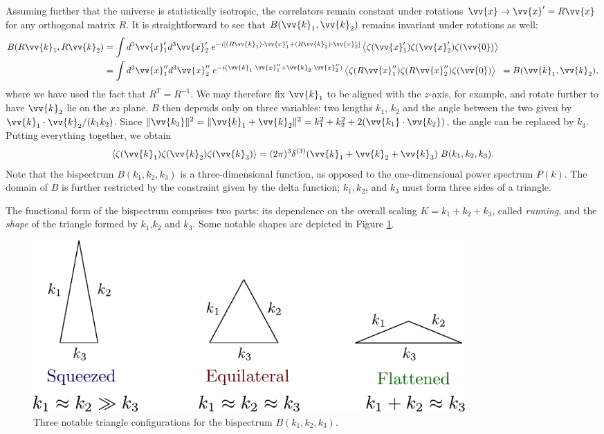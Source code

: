 \documentclass[a4paper,12pt,times,custombib,print,index]{Classes/PhDThesisPSnPDF} %
\providecommand{\DIFadd}[1]{{\protect\color{blue}\uwave{#1}}} %
\providecommand{\DIFdel}[1]{{\protect\color{red}\sout{#1}}}                      %
\providecommand{\DIFaddbegin}{} %
\providecommand{\DIFaddend}{} %
\providecommand{\DIFdelbegin}{} %
\providecommand{\DIFdelend}{} %
\newcommand{\DIFscaledelfig}{0.5}
\newlength{\DIFdelgraphicswidth} %
\newlength{\DIFdelgraphicsheight} %
\newcommand{\DIFaddincludegraphics}[2][]{{\color{blue}\fbox{\DIFOincludegraphics[#1]{#2}}}} %
\newcommand{\DIFdelincludegraphics}[2][]{%
\sbox{\DIFdelgraphicsbox}{\DIFOincludegraphics[#1]{#2}}%
\settoboxwidth{\DIFdelgraphicswidth}{\DIFdelgraphicsbox} %
\settoboxtotalheight{\DIFdelgraphicsheight}{\DIFdelgraphicsbox} %
\scalebox{\DIFscaledelfig}{%
\parbox[b]{\DIFdelgraphicswidth}{\usebox{\DIFdelgraphicsbox}\\[-\baselineskip] \rule{\DIFdelgraphicswidth}{0em}}\llap{\resizebox{\DIFdelgraphicswidth}{\DIFdelgraphicsheight}{%
\setlength{\unitlength}{\DIFdelgraphicswidth}%
\begin{picture}(1,1)%
\thicklines\linethickness{2pt} %
{\color[rgb]{1,0,0}\put(0,0){\framebox(1,1){}}}%
{\color[rgb]{1,0,0}\put(0,0){\line( 1,1){1}}}%
{\color[rgb]{1,0,0}\put(0,1){\line(1,-1){1}}}%
\end{picture}%
}\hspace*{3pt}}} %
} %
\DeclareRobustCommand{\DIFaddbegin}{\DIFOaddbegin \let\includegraphics\DIFaddincludegraphics} %
\DeclareRobustCommand{\DIFaddend}{\DIFOaddend \let\includegraphics\DIFOincludegraphics} %
\DeclareRobustCommand{\DIFdelbegin}{\DIFOdelbegin \let\includegraphics\DIFdelincludegraphics} %
\DeclareRobustCommand{\DIFdelend}{\DIFOaddend \let\includegraphics\DIFOincludegraphics} %
\begin{document}
Assuming further that the universe is statistically isotropic, the correlators remain constant under rotations \DIFdelbegin \DIFdel{$\vv{x} \rightarrow \vv{x}' = R \vv{x}$ }\DIFdelend \DIFaddbegin \DIFadd{$\vv{x} \rightarrow \tilde{\vv{x}} = R \vv{x}$ }\DIFaddend for any orthogonal matrix $R$. It is straightforward to see that $B(\vv{k}_1,\vv{k}_2)$ remains invariant under rotations as well;
\begin{align}
	B(R\vv{k}_1, R\vv{k}_2) &= \int d^3\vv{x}'_1 d^3\vv{x}'_2 \; e^{-i[ (R\vv{k}_1) \cdot \vv{x}'_1 + (R\vv{k}_2) \cdot \vv{x}'_2]} \left< \zeta(\vv{x}'_1) \zeta(\vv{x}'_2) \zeta(\vv{0}) \right> \\
	&= \int d^3\vv{x}''_1 d^3\vv{x}''_2 \; e^{-i( \vv{k}_1 \cdot \vv{x}''_1 + \vv{k}_2 \cdot \vv{x}''_2)} \left< \zeta(R \vv{x}''_1) \zeta(R \vv{x}''_2) \zeta(\vv{0}) \right> \;\;= B(\vv{k}_1, \vv{k}_2),
\end{align}
where we have used the fact that $R^T=R^{-1}$. We may therefore fix $\vv{k}_1$ to be aligned with the $z$-axis, for example, and rotate further to have $\vv{k}_2$ lie on the $xz$ plane. $B$ then depends only on three variables: two lengths $k_1$, $k_2$ and the angle between the two given by $\vv{k}_1 \cdot \vv{k}_2 / (k_1 k_2)$. Since $\| \vv{k_3} \|^2 = \| \vv{k}_1+\vv{k}_2 \|^2 = k_1^2 + k_2^2 + 2(\vv{k_1}\cdot\vv{k_2})$, the angle can be replaced by $k_3$. Putting everything together, we obtain
\begin{align}
	\left< \zeta(\vv{k}_1) \zeta(\vv{k}_2) \zeta(\vv{k}_3) \right> =  (2\pi)^3 \delta^{(3)}(\vv{k}_1 + \vv{k}_2 + \vv{k}_3) \; B(k_1, k_2, k_3).
\end{align}
Note that the bispectrum $B(k_1,k_2,k_3)$ is a three-dimensional function, as opposed to the one-dimensional power spectrum $P(k)$. The domain of $B$ is further restricted by the constraint given by the delta function; $k_1,k_2$, and $k_3$ must form three sides of a triangle.

The functional form of the bispectrum comprises two parts: its dependence on the overall scaling $K=k_1+k_2+k_3$, called \textit{running}, and the \textit{shape} of the triangle formed by $k_1$,$k_2$ and $k_3$. Some notable shapes are depicted in Figure \ref{fig:triangle_configurations}.

\begin{figure}
	\centering
	\includegraphics[width=0.8\textwidth]{triangle_configurations.pdf}
	\hspace{10pt}
	\caption{Three notable triangle configurations for the bispectrum $B(k_1,k_2,k_3)$.}
	\label{fig:triangle_configurations}
\end{figure}
\end{document}
